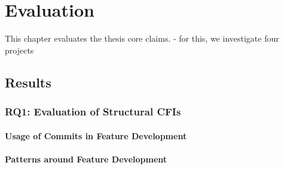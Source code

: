 \chapter{Evaluation}\label{ch:evaluation}

This chapter evaluates the thesis core claims.
- for this, we investigate four projects

\section{Results}\label{sec:results}

\subsection*{\textbf{RQ1: Evaluation of Structural CFIs}}\label{sec:eval_struc_cfis}

\subsubsection*{Usage of Commits in Feature Development}\label{sec:eval_commit_usage}

\subsubsection*{Patterns around Feature Development}\label{sec:eval_feature_development}

